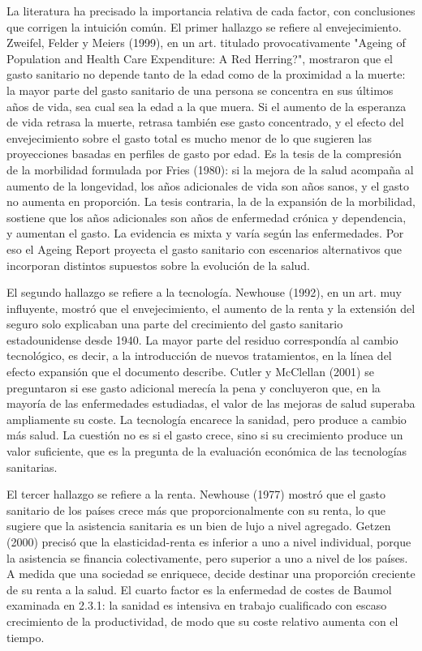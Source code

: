 \documentclass[10pt,a4paper]{article}
\begin{document}
La literatura ha precisado la importancia relativa de cada factor, con conclusiones que corrigen la intuición común. El primer hallazgo se refiere al envejecimiento. Zweifel, Felder y Meiers (1999), en un art. titulado provocativamente "Ageing of Population and Health Care Expenditure: A Red Herring?", mostraron que el gasto sanitario no depende tanto de la edad como de la proximidad a la muerte: la mayor parte del gasto sanitario de una persona se concentra en sus últimos años de vida, sea cual sea la edad a la que muera. Si el aumento de la esperanza de vida retrasa la muerte, retrasa también ese gasto concentrado, y el efecto del envejecimiento sobre el gasto total es mucho menor de lo que sugieren las proyecciones basadas en perfiles de gasto por edad. Es la tesis de la compresión de la morbilidad formulada por Fries (1980): si la mejora de la salud acompaña al aumento de la longevidad, los años adicionales de vida son años sanos, y el gasto no aumenta en proporción. La tesis contraria, la de la expansión de la morbilidad, sostiene que los años adicionales son años de enfermedad crónica y dependencia, y aumentan el gasto. La evidencia es mixta y varía según las enfermedades. Por eso el Ageing Report proyecta el gasto sanitario con escenarios alternativos que incorporan distintos supuestos sobre la evolución de la salud.

El segundo hallazgo se refiere a la tecnología. Newhouse (1992), en un art. muy influyente, mostró que el envejecimiento, el aumento de la renta y la extensión del seguro solo explicaban una parte del crecimiento del gasto sanitario estadounidense desde 1940. La mayor parte del residuo correspondía al cambio tecnológico, es decir, a la introducción de nuevos tratamientos, en la línea del efecto expansión que el documento describe. Cutler y McClellan (2001) se preguntaron si ese gasto adicional merecía la pena y concluyeron que, en la mayoría de las enfermedades estudiadas, el valor de las mejoras de salud superaba ampliamente su coste. La tecnología encarece la sanidad, pero produce a cambio más salud. La cuestión no es si el gasto crece, sino si su crecimiento produce un valor suficiente, que es la pregunta de la evaluación económica de las tecnologías sanitarias.

El tercer hallazgo se refiere a la renta. Newhouse (1977) mostró que el gasto sanitario de los países crece más que proporcionalmente con su renta, lo que sugiere que la asistencia sanitaria es un bien de lujo a nivel agregado. Getzen (2000) precisó que la elasticidad-renta es inferior a uno a nivel individual, porque la asistencia se financia colectivamente, pero superior a uno a nivel de los países. A medida que una sociedad se enriquece, decide destinar una proporción creciente de su renta a la salud. El cuarto factor es la enfermedad de costes de Baumol examinada en 2.3.1: la sanidad es intensiva en trabajo cualificado con escaso crecimiento de la productividad, de modo que su coste relativo aumenta con el tiempo.
\end{document}

